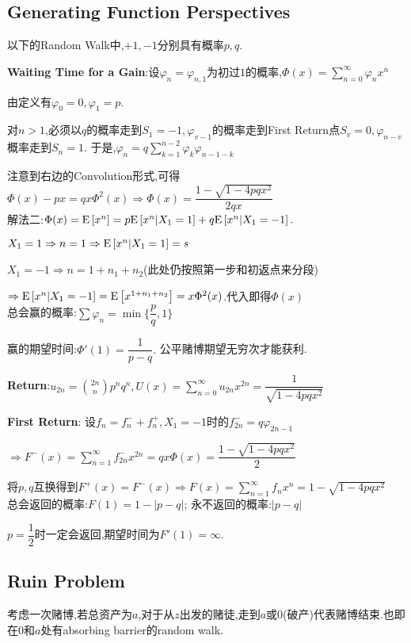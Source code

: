 \subsection{Generating Function Perspectives}
以下的Random Walk中,$ +1,-1$分别具有概率$ p,q$.

\textbf{Waiting Time for a Gain}:设$ \varphi_{n} = \varphi_{n,1}$为初过$ 1$的概率,$ \Phi(x)=\sum_{n=0}^\infty{\varphi_nx^n}$

由定义有$ \varphi_0=0,\varphi_1=p$.

对$ n>1$,必须以$q$的概率走到$ S_1 = -1,\varphi_{v-1}$的概率走到First Return点$ S_v = 0,\varphi_{n-v}$概率走到$ S_n=1$.
于是,$ \varphi_n = q\sum_{k=1}^{n-2}{\varphi_k\varphi_{n-1-k}}$

注意到右边的Convolution形式,可得$ \Phi(x)-px = qx\Phi^2(x)\Rightarrow \Phi(x) = \dfrac{1-\sqrt{1-4pqx^2}}{2qx}$
\\

解法二:$ \Phi(x) = \text{E}\left[x^n\right] = p\text{E}\left[x^n | X_1=1\right] + q\text{E}\left[x^n|X_1=-1\right].$

$X_1=1\Rightarrow n=1\Rightarrow \text{E}\left[x^n|X_1=1\right]=s$

$ X_1=-1\Rightarrow n=1+n_1+n_2$(此处仍按照第一步和初返点来分段)

$ \Rightarrow \text{E}\left[x^n|X_1=-1\right]=\text{E}\left[x^{1+n_1+n_2}\right]=x\Phi^2(x)$.代入即得$ \Phi(x)$
\\

总会赢的概率:$ \sum{\varphi_n} = \min\{\dfrac{p}{q},1\}$

赢的期望时间:$ \Phi'(1) = \dfrac{1}{p-q}.$ 公平赌博期望无穷次才能获利.
\vspace{0.6cm}

\textbf{Return}:$ u_{2n} = {{2n}\choose{n}} p^nq^n,U(x) = \sum_{n=0}^\infty u_{2n}x^{2n} = \dfrac{1}{\sqrt{1-4pqx^2}}$

\textbf{First Return}:
设$f_n = f_n^{-}+f_n^+, X_1=-1$时的$ f_{2n}^- = q\varphi_{2n-1}$

$\Rightarrow F^-(x) = \sum_{n=1}^\infty f_{2n}^-x^{2n}=qx\Phi(x)=\dfrac{1-\sqrt{1-4pqx^2}}{2}$

将$ p,q$互换得到$ F^+(x)=F^-(x) \Rightarrow F(x)=\sum_{n=1}^\infty f_nx^n = 1-\sqrt{1-4pqx^2}$
\\

总会返回的概率:$ F(1) = 1-|p-q|$; 永不返回的概率:$ |p-q|$

$ p=\dfrac{1}{2}$时一定会返回,期望时间为$ F'(1)=\infty$.

\subsection{Ruin Problem}
考虑一次赌博,若总资产为$ a$,对于从$z$出发的赌徒,走到$ a$或$0$(破产)代表赌博结束.也即在$0$和$a$处有absorbing barrier的random walk.

